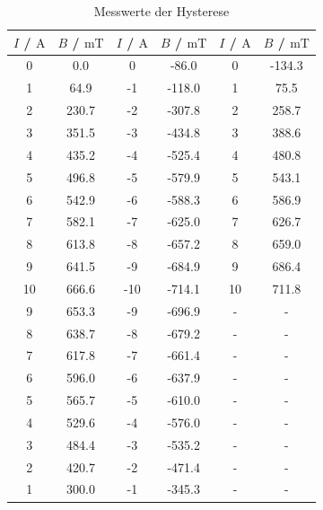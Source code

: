 \begin{table}
\centering
\caption{Messwerte der Hysterese}
\begin{tabular}{c c c c c c}
  \toprule
  $I$ / $\unit{\ampere}$ &  $B$ / $\unit{\milli\tesla}$ &  $I$ / $\unit{\ampere}$ &  $B$ / $\unit{\milli\tesla}$ &  $I$ / $\unit{\ampere}$ &  $B$ / $\unit{\milli\tesla}$\\
  \midrule
     0 &        0.0 &         0 &      -86.0 &   0 &     -134.3 \\
     1 &       64.9 &        -1 &     -118.0 &   1 &       75.5 \\
     2 &      230.7 &        -2 &     -307.8 &   2 &      258.7 \\
     3 &      351.5 &        -3 &     -434.8 &   3 &      388.6 \\
     4 &      435.2 &        -4 &     -525.4 &   4 &      480.8 \\
     5 &      496.8 &        -5 &     -579.9 &   5 &      543.1 \\
     6 &      542.9 &        -6 &     -588.3 &   6 &      586.9 \\
     7 &      582.1 &        -7 &     -625.0 &   7 &      626.7 \\
     8 &      613.8 &        -8 &     -657.2 &   8 &      659.0 \\
     9 &      641.5 &        -9 &     -684.9 &   9 &      686.4 \\
    10 &      666.6 &       -10 &     -714.1 &  10 &      711.8 \\
     9 &      653.3 &        -9 &     -696.9 &  -  &        -     \\
     8 &      638.7 &        -8 &     -679.2 &  -  &        -     \\
     7 &      617.8 &        -7 &     -661.4 &  -  &        -     \\
     6 &      596.0 &        -6 &     -637.9 &  -  &        -     \\
     5 &      565.7 &        -5 &     -610.0 &  -  &        -     \\
     4 &      529.6 &        -4 &     -576.0 &  -  &        -     \\
     3 &      484.4 &        -3 &     -535.2 &  -  &        -     \\
     2 &      420.7 &        -2 &     -471.4 &  -  &        -     \\
     1 &      300.0 &        -1 &     -345.3 &  -  &        -     \\
  \bottomrule
  \end{tabular}
\end{table}

